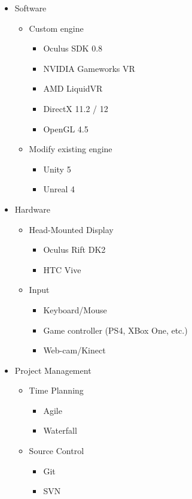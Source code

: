 		\begin{itemize}
			\item Software
			\begin{itemize}
				\item Custom engine
				\begin{itemize}
					\item Oculus SDK 0.8
					\item NVIDIA Gameworks VR
					\item AMD LiquidVR
					\item DirectX 11.2 / 12
					\item OpenGL 4.5
				\end{itemize}
				\item Modify existing engine
				\begin{itemize}
					\item Unity 5
					\item Unreal 4
				\end{itemize}
			\end{itemize}
			\item Hardware
			\begin{itemize}
				\item Head-Mounted Display
				\begin{itemize}
					\item Oculus Rift DK2
					\item HTC Vive
				\end{itemize}
				\item Input
				\begin{itemize}
					\item Keyboard/Mouse
					\item Game controller (PS4, XBox One, etc.)
					\item Web-cam/Kinect
				\end{itemize}
			\end{itemize}
			\item Project Management
			\begin{itemize}
				\item Time Planning
				\begin{itemize}
					\item Agile
					\item Waterfall
				\end{itemize}
				\item Source Control
				\begin{itemize}
					\item Git
					\item SVN
				\end{itemize}
			\end{itemize}
		\end{itemize}

